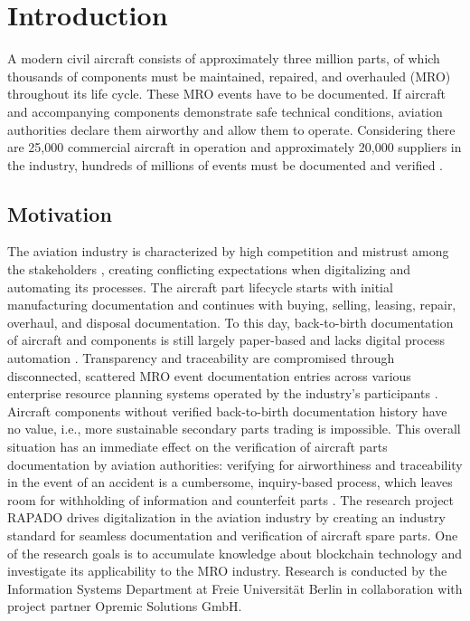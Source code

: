 \chapter{Introduction}
A modern civil aircraft consists of approximately three million parts, of which thousands of components must be maintained, repaired, and overhauled (MRO) throughout its life cycle. These MRO events have to be documented. If aircraft and accompanying components demonstrate safe technical conditions, aviation authorities declare them airworthy and allow them to operate. Considering there are 25,000 commercial aircraft in operation and approximately 20,000 suppliers in the industry, hundreds of millions of events must be documented and verified \citep{mroBCservices1}.
\section{Motivation}
The aviation industry is characterized by high competition and mistrust among the stakeholders \citep{Chatzi2019TDoC}, creating conflicting expectations when digitalizing and automating its processes. The aircraft part lifecycle starts with initial manufacturing documentation and continues with buying, selling, leasing, repair, overhaul, and disposal documentation. To this day, back-to-birth documentation of aircraft and components is still largely paper-based and lacks digital process automation \citep{efthymiou}. Transparency and traceability are compromised through disconnected, scattered MRO event documentation entries across various enterprise resource planning systems operated by the industry's participants \citep{mroBCservices1}. Aircraft components without verified back-to-birth documentation history have no value, i.e., more sustainable secondary parts trading is impossible. This overall situation has an immediate effect on the verification of aircraft parts documentation by aviation authorities: verifying for airworthiness and traceability in the event of an accident is a cumbersome, inquiry-based process, which leaves room for withholding of information and counterfeit parts \citep{planecrash}. 
The research project RAPADO drives digitalization in the aviation industry by creating an industry standard for seamless documentation and verification of aircraft spare parts. One of the research goals is to accumulate knowledge about blockchain technology and investigate its applicability to the MRO industry. Research is conducted by the Information Systems Department at Freie Universit{\"a}t Berlin in collaboration with project partner Opremic Solutions GmbH.

